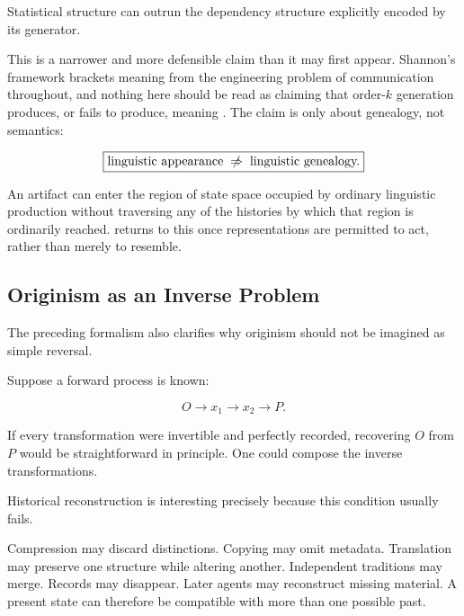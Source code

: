 \documentclass[
  11pt,
  a4paper,
  DIV=12,
  BCOR=0mm,
  parskip=half-
]{scrartcl}
\newcommand{\nimplies}{%
  \centernot\Rightarrow
}
\theoremstyle{definition}
\theoremstyle{plain}
\theoremstyle{remark}
\begin{document}
\begin{held}
\centering
Statistical structure can outrun the dependency structure explicitly
encoded by its generator.
\end{held}

This is a narrower and more defensible claim than it may first appear.
Shannon's framework brackets meaning from the engineering problem of
communication throughout, and nothing here should be read as claiming that
order-\(k\) generation produces, or fails to produce, meaning
\cite{shannon1948}. The claim is only about genealogy, not semantics:

\[
  \boxed{
    \text{linguistic appearance}
    \;\nimplies\;
    \text{linguistic genealogy.}
  }
\]

An artifact can enter the region of state space occupied by ordinary
linguistic production without traversing any of the histories by which that
region is ordinarily reached.  returns
to this once representations are permitted to act, rather than merely to
resemble.


\subsection{Originism as an Inverse Problem}
\label{sec:inverse-problem}

The preceding formalism also clarifies why originism should not be imagined as
simple reversal.

Suppose a forward process is known:

\[
  O
  \longrightarrow
  x_1
  \longrightarrow
  x_2
  \longrightarrow
  P.
\]

If every transformation were invertible and perfectly recorded, recovering
\(O\) from \(P\) would be straightforward in principle. One could compose the
inverse transformations.

Historical reconstruction is interesting precisely because this condition
usually fails.

Compression may discard distinctions. Copying may omit metadata. Translation
may preserve one structure while altering another. Independent traditions may
merge. Records may disappear. Later agents may reconstruct missing material.
A present state can therefore be compatible with more than one possible past.
\end{document}
